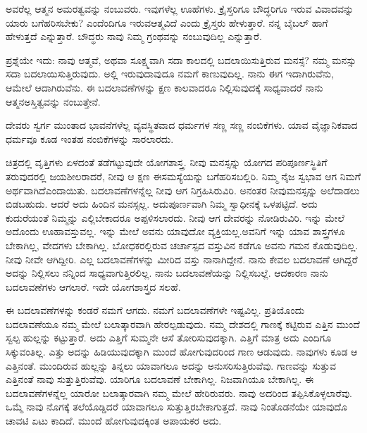ಅವರೆಲ್ಲ ಆತ್ಮನ ಅಮರತ್ವವನ್ನು ನಂಬುವರು. ಇವುಗಳೆಲ್ಲ ಊಹೆಗಳು. ಕ್ರೈಸ್ತರಿಗೂ ಬೌದ್ಧರಿಗೂ ಇರುವ ವಿವಾದವನ್ನು ಯಾರು ಬಗೆಹರಿಸಬೇಕು? ಎಂದೆಂದಿಗೂ ಇರುವ\break ಆತ್ಮವಿದೆ ಎಂದು ಕ್ರೈಸ್ತರು ಹೇಳುತ್ತಾರೆ. ನನ್ನ ಬೈಬಲ್​ ಹಾಗೆ ಹೇಳುತ್ತದೆ ಎನ್ನುತ್ತಾರೆ. ಬೌದ್ಧರು ನಾವು ನಿಮ್ಮ ಗ್ರಂಥವನ್ನು ನಂಬುವುದಿಲ್ಲ ಎನ್ನುತ್ತಾರೆ.

\vskip 5pt

ಪ್ರಶ್ನೆಯೇ ಇದು: ನಾವು ಆತ್ಮವೆ, ಅಥವಾ ಸೂಕ್ಷ್ಮವಾಗಿ ಸದಾ ಕಾಲದಲ್ಲಿ ಬದಲಾಯಿಸು\-ತ್ತಿರುವ ಮನಸ್ಸೆ? ನಮ್ಮ ಮನಸ್ಸು ಸದಾ ಬದಲಾಯಿಸುತ್ತಿರುವುದು. ಅಲ್ಲಿ ಇರುವುದಾವುದೂ ನಮಗೆ ಕಾಣುವುದಿಲ್ಲ. ನಾನು ಈಗ ಇದಾಗಿರುವೆನು, ಆಮೇಲೆ ಆದಾಗಿರುವೆನು. ಈ ಬದಲಾವಣೆಗಳನ್ನು ಕ್ಷಣ ಕಾಲವಾದರೂ ನಿಲ್ಲಿಸುವುದಕ್ಕೆ ಸಾಧ್ಯವಾದರೆ ನಾನು ಆತ್ಮನ\break ಅಸ್ತಿತ್ವವನ್ನು ನಂಬುತ್ತೇನೆ.

\vskip 5pt

ದೇವರು ಸ್ವರ್ಗ ಮುಂತಾದ ಭಾವನೆಗಳೆಲ್ಲ ವ್ಯವಸ್ಥಿತವಾದ ಧರ್ಮಗಳ ಸಣ್ಣ ಸಣ್ಣ ನಂಬಿಕೆಗಳು. ಯಾವ ವೈಜ್ಞಾನಿಕವಾದ ಧರ್ಮವೂ ಕೂಡ ಇಂತಹ ನಂಬಿಕೆಗಳನ್ನು ಸಾರಲಾರದು.

\vskip 5pt

ಚಿತ್ರದಲ್ಲಿ ವೃತ್ತಿಗಳು ಏಳದಂತೆ ತಡೆಗಟ್ಟುವುದೇ ಯೋಗಶಾಸ್ತ್ರ. ನೀವು ಮನಸ್ಸನ್ನು ಯೋಗದ ಪರಿಪೂರ್ಣಸ್ಥಿತಿಗೆ ತರುವುದರಲ್ಲಿ ಜಯಶೀಲರಾದರೆ, ನೀವು ಆ ಕ್ಷಣ ಈ\break ಸಮಸ್ಯೆಯನ್ನು ಬಗೆಹರಿಸಬಲ್ಲಿರಿ. ನಿಮ್ಮ ನೈಜ ಸ್ವಭಾವ ಆಗ ನಿಮಗೆ ಅರ್ಥವಾಗಿದೆ\break ಎಂದಾಯಿತು. ಬದಲಾವಣೆಗಳನ್ನೆಲ್ಲ ನೀವು ಆಗ ನಿಗ್ರಹಿಸಿರುವಿರಿ. ಅನಂತರ ನೀವು\break ಮನಸ್ಸನ್ನು ಅಲೆದಾಡಲು ಬಿಡಬಹುದು. ಆದರೆ ಅದು ಹಿಂದಿನ ಮನಸ್ಸಲ್ಲ. ಅದು\break ಪೂರ್ಣವಾಗಿ ನಿಮ್ಮ ಸ್ವಾಧೀನಕ್ಕೆ ಒಳಪಟ್ಟಿದೆ. ಅದು ಕುದುರೆಯಂತೆ ನಿಮ್ಮನ್ನು ಎಲ್ಲಿ\break ಬೇಕಾದರೂ ಅಪ್ಪಳಿಸಲಾರದು. ನೀವು ಆಗ ದೇವರನ್ನು ನೋಡಿರುವಿರಿ. ಇನ್ನು ಮೇಲೆ ಅದೊಂದು ಊಹಾವಸ್ತುವಲ್ಲ. ಇನ್ನು ಮೇಲೆ ಅವನು ಯಾವುದೋ ವ್ಯಕ್ತಿಯಲ್ಲ.\break ಅವನಿಗೆ ಇನ್ನು ಯಾವ ಶಾಸ್ತ್ರಗಳೂ ಬೇಕಾಗಿಲ್ಲ, ವೇದಗಳು ಬೇಕಾಗಿಲ್ಲ. ಬೋಧಕರಲ್ಲಿರುವ ಚರ್ಚಾಸ್ಪದ ವಸ್ತುವಿನ ಕಡೆಗೂ ಅವನು ಗಮನ ಕೊಡುವುದಿಲ್ಲ. ನೀವು ನೀವೇ ಆಗಿದ್ದೀರಿ. ಎಲ್ಲ ಬದಲಾವಣೆಗಳನ್ನು ಮೀರಿದ ವಸ್ತು ನಾನಾಗಿದ್ದೇನೆ. ನಾನು ಕೇವಲ ಬದಲಾವಣೆ ಆಗಿದ್ದರೆ ಅದನ್ನು ನಿಲ್ಲಿಸಲು ನನ್ನಿಂದ ಸಾಧ್ಯವಾಗುತ್ತಿರಲಿಲ್ಲ. ನಾನು ಬದಲಾವಣೆಯನ್ನು ನಿಲ್ಲಿಸಬಲ್ಲೆ. ಆದಕಾರಣ ನಾನು ಬದಲಾವಣೆಗಳು ಆಗಲಾರೆ. ಇದೇ ಯೋಗಶಾಸ್ತ್ರದ ಸಲಹೆ.

\vskip 5pt

ಈ ಬದಲಾವಣೆಗಳನ್ನು ಕಂಡರೆ ನಮಗೆ ಆಗದು. ನಮಗೆ ಬದಲಾವಣೆಗಳೇ ಇಷ್ಟವಿಲ್ಲ. ಪ್ರತಿಯೊಂದು ಬದಲಾವಣೆಯೂ ನಮ್ಮ ಮೇಲೆ ಬಲಾತ್ಕಾರವಾಗಿ ಹೇರಲ್ಪಡುವುದು. ನಮ್ಮ ದೇಶದಲ್ಲಿ ಗಾಣಕ್ಕೆ ಕಟ್ಟಿರುವ ಎತ್ತಿನ ಮುಂದೆ ಸ್ವಲ್ಪ ಹುಲ್ಲನ್ನು ಕಟ್ಟುತ್ತಾರೆ. ಅದು ಎತ್ತಿಗೆ ಸುಮ್ಮನೇ ಆಸೆ ತೋರಿಸುವುದಕ್ಕಾಗಿ. ಎತ್ತಿಗೆ ಮಾತ್ರ ಅದು ಎಂದಿಗೂ ಸಿಕ್ಕುವಂತಿಲ್ಲ. ಎತ್ತು ಅದನ್ನು ಹಿಡಿಯುವುದಕ್ಕಾಗಿ ಮುಂದೆ ಹೋಗುವುದರಿಂದ ಗಾಣ ಆಡುವುದು. ನಾವುಗಳು ಕೂಡ ಆ ಎತ್ತಿನಂತೆ. ಮುಂದಿರುವ ಹುಲ್ಲನ್ನು ತಿನ್ನಲು ಯಾವಾಗಲೂ ಅದನ್ನು ಅನುಸರಿಸುತ್ತಿರುವೆವು. ಗಾಣವನ್ನು ಸುತ್ತುವ ಎತ್ತಿನಂತೆ ನಾವು ಸುತ್ತುತ್ತಿರುವೆವು. ಯಾರಿಗೂ ಬದಲಾವಣೆ ಬೇಕಾಗಿಲ್ಲ. ನಿಜವಾಗಿಯೂ ಬೇಕಾಗಿಲ್ಲ. ಈ ಬದಲಾವಣೆಗಳನ್ನೆಲ್ಲ ಯಾರೋ ಬಲಾತ್ಕಾರವಾಗಿ ನಮ್ಮ ಮೇಲೆ ಹೇರಿರುವರು. ನಾವು ಅದರಿಂದ ತಪ್ಪಿಸಿಕೊಳ್ಳಲಾರೆವು. ಒಮ್ಮೆ ನಾವು ನೊಗಕ್ಕೆ ತಲೆಯೊಡ್ಡಿದರೆ ಯಾವಾಗಲೂ ಸುತ್ತುತ್ತಿರಬೇಕಾಗುತ್ತದೆ. ನಾವು ನಿಂತೊಡನೆಯೇ ಯಾವುದೊ ಚಾವಟಿ ಏಟು ಕಾದಿದೆ. ಮುಂದೆ ಹೋಗುವುದಕ್ಕಿಂತ ಅಪಾಯಕರ ಅದು.

